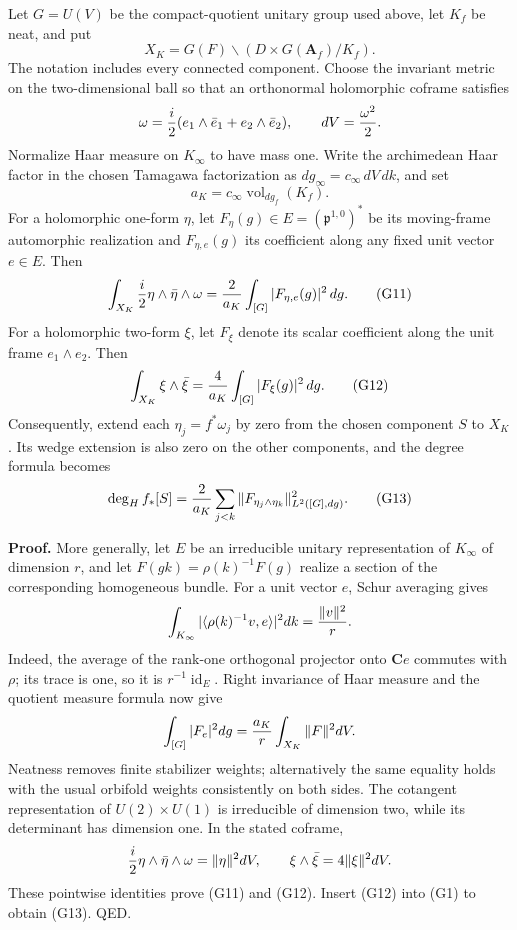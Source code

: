 Let \(G=U(V)\) be the compact-quotient unitary group used above, let \(K_f\) be neat, and put \[
X_K=G(F)\backslash(D\times G(\mathbf A_f)/K_f).
\] The notation includes every connected component. Choose the invariant metric on the two-dimensional ball so that an orthonormal holomorphic coframe satisfies \[
\omega={i\over2}(e_1\wedge\bar e_1+e_2\wedge\bar e_2),\qquad dV={\omega^2\over2}.
\] Normalize Haar measure on \(K_\infty\) to have mass one. Write the archimedean Haar factor in the chosen Tamagawa factorization as \(dg_\infty=c_\infty\,dV\,dk\), and set \[
a_K=c_\infty\operatorname{vol}_{dg_f}(K_f).
\] For a holomorphic one-form \(\eta\), let \(F_\eta(g)\in E=(\mathfrak p^{1,0})^*\) be its moving-frame automorphic realization and \(F_{\eta,e}(g)\) its coefficient along any fixed unit vector \(e\in E\). Then \[
\int_{X_K}{i\over2}\eta\wedge\bar\eta\wedge\omega
={2\over a_K}\int_{[G]}|F_{\eta,e}(g)|^2\,dg.
\tag{G11}
\] For a holomorphic two-form \(\xi\), let \(F_\xi\) denote its scalar coefficient along the unit frame \(e_1\wedge e_2\). Then \[
\int_{X_K}\xi\wedge\bar\xi
={4\over a_K}\int_{[G]}|F_\xi(g)|^2\,dg.
\tag{G12}
\] Consequently, extend each \(\eta_j=f^*\omega_j\) by zero from the chosen component \(S\) to \(X_K\). Its wedge extension is also zero on the other components, and the degree formula becomes \[
\deg_H f_*[S]={2\over a_K}\sum_{j<k}\|F_{\eta_j\wedge\eta_k}\|_{L^2([G],dg)}^2.
\tag{G13}
\]

\textbf{Proof.} More generally, let \(E\) be an irreducible unitary representation of \(K_\infty\) of dimension \(r\), and let \(F(gk)=\rho(k)^{-1}F(g)\) realize a section of the corresponding homogeneous bundle. For a unit vector \(e\), Schur averaging gives \[
\int_{K_\infty}|\langle\rho(k)^{-1}v,e\rangle|^2dk={\|v\|^2\over r}.
\] Indeed, the average of the rank-one orthogonal projector onto \(\mathbf Ce\) commutes with \(\rho\); its trace is one, so it is \(r^{-1}\operatorname{id}_E\). Right invariance of Haar measure and the quotient measure formula now give \[
\int_{[G]}|F_e|^2dg={a_K\over r}\int_{X_K}\|F\|^2dV.
\] Neatness removes finite stabilizer weights; alternatively the same equality holds with the usual orbifold weights consistently on both sides. The cotangent representation of \(U(2)\times U(1)\) is irreducible of dimension two, while its determinant has dimension one. In the stated coframe, \[
{i\over2}\eta\wedge\bar\eta\wedge\omega=\|\eta\|^2dV,
\qquad
\xi\wedge\bar\xi=4\|\xi\|^2dV.
\] These pointwise identities prove (G11) and (G12). Insert (G12) into (G1) to obtain (G13). QED.

